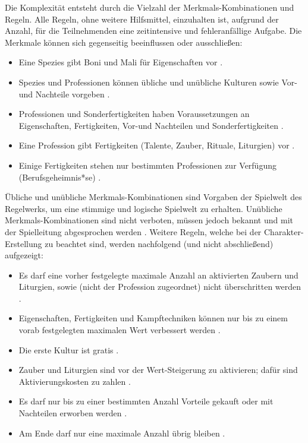 Die Komplexität entsteht durch die Vielzahl der Merkmals-Kombinationen und Regeln.
Alle Regeln, ohne weitere Hilfsmittel, einzuhalten ist, aufgrund der Anzahl, für die Teilnehmenden eine zeitintensive und fehleranfällige Aufgabe.
Die \og Merkmale können sich \bspw gegenseitig beeinflussen oder ausschließen:
\begin{itemize}
    \item Eine Spezies gibt Boni und Mali für Eigenschaften vor .
    \item Spezies und Professionen können übliche und unübliche Kulturen sowie Vor- und Nachteile vorgeben .
    \item Professionen und Sonderfertigkeiten haben Voraussetzungen \uA \ggfs an Eigenschaften, Fertigkeiten, Vor-und Nachteilen und Sonderfertigkeiten .
    \item Eine Profession gibt Fertigkeiten (Talente, Zauber, Rituale, Liturgien) vor .
    \item Einige Fertigkeiten stehen nur bestimmten Professionen zur Verfügung (\sog Berufsgeheimnis*se) .
\end{itemize}

Übliche und unübliche Merkmals-Kombinationen sind Vorgaben der Spielwelt \bzw des Regelwerks, um eine stimmige und logische Spielwelt zu erhalten. %
Unübliche Merkmals-Kombinationen sind nicht verboten, müssen jedoch bekannt und mit der Spielleitung abgesprochen werden .
Weitere Regeln, welche bei der Charakter-Erstellung zu beachtet sind, werden nachfolgend (und nicht abschließend) aufgezeigt:
\begin{itemize}
    \item Es darf eine vorher festgelegte maximale Anzahl an aktivierten Zaubern und Liturgien, sowie  (nicht der Profession zugeordnet) nicht überschritten werden .
    \item Eigenschaften, Fertigkeiten und Kampftechniken können nur bis zu einem vorab festgelegten maximalen Wert verbessert werden .
    \item Die erste Kultur ist gratis .
    \item Zauber und Liturgien sind vor der Wert-Steigerung zu aktivieren; dafür sind Aktivierungskosten zu zahlen .
    \item Es darf nur bis zu einer bestimmten Anzahl  Vorteile gekauft oder mit Nachteilen erworben werden .
    \item Am Ende darf nur eine maximale Anzahl  übrig bleiben .
\end{itemize}




